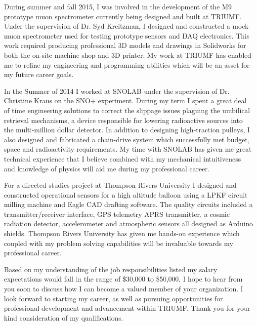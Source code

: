 \documentclass[11pt,a4paper]{moderncv} %
\begin{document}
During summer and fall 2015, I was involved in the development of the M9 prototype muon spectrometer currently being designed and built at TRIUMF. Under the supervision of Dr. Syd Kreitzman, I designed and constructed a mock muon spectrometer used for testing prototype sensors and DAQ electronics. This work required producing professional 3D models and drawings in Solidworks for both the on-site machine shop and 3D printer. My work at TRIUMF has enabled me to refine my engineering and programming abilities which will be an asset for my future career goals. 

In the Summer of 2014 I worked at SNOLAB under the supervision of Dr. Christine Kraus on the SNO+ experiment. During my term I spent a great deal of time engineering solutions to correct the slippage issues plaguing the umbilical retrieval mechanisms, a device responsible for lowering radioactive sources into the multi-million dollar detector. In addition to designing high-traction pulleys, I also designed and fabricated a chain-drive system which successfully met budget, space and radioactivity requirements. My time with SNOLAB has given me great technical experience that I believe combined with my mechanical intuitiveness and knowledge of physics will aid me during my professional career.

 For a directed studies project at Thompson Rivers University I designed and constructed operational sensors for a high altitude balloon using a LPKF circuit milling machine and Eagle CAD drafting software. The quality circuits included a transmitter/receiver interface, GPS telemetry APRS transmitter, a cosmic radiation detector, accelerometer and atmospheric sensors all designed as Arduino shields. Thompson Rivers University has given me hands-on experience which coupled with my problem solving capabilities will be invaluable towards my professional career.
 
Based on my understanding of the job responsibilities listed my salary expectations would fall in the range of \$30,000 to \$50,000. I hope to hear from you soon to discuss how I can become a valued member of your organization. I look forward to starting my career, as well as pursuing opportunities for professional development and advancement within TRIUMF. Thank you for your kind consideration of my qualifications.

\makeletterclosing %


\end{document}
